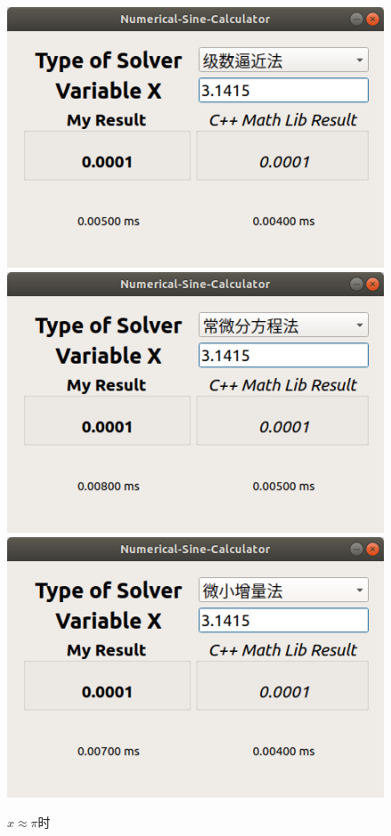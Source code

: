 \documentclass[UTF8]{ctexart}
\begin{document}
\begin{figure}[H]
    \centering
    \includegraphics[scale=0.25]{images/series31415.png}
    \includegraphics[scale=0.25]{images/diff31415.png}
    \includegraphics[scale=0.25]{images/delta31415.png}
    \caption{$x \approx \pi $时}
\end{figure}
\end{document}
